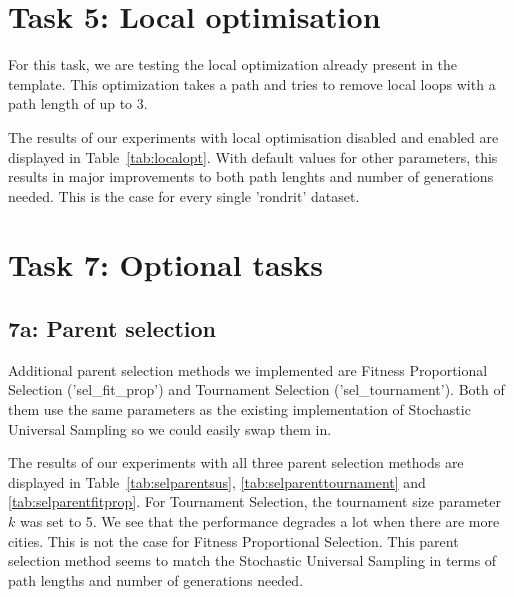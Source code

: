 \documentclass{report}
\begin{document}
\section{Task 5: Local optimisation}
\label{sec:local}
For this task, we are testing the local optimization already present in the template. This optimization takes a path and tries to remove local loops with a path length of up to 3.

The results of our experiments with local optimisation disabled and enabled are displayed in Table~\ref{tab:localopt}. With default values for other parameters, this results in major improvements to both path lenghts and number of generations needed. This is the case for every single 'rondrit' dataset.




\section{Task 7: Optional tasks}
\subsection{7a: Parent selection}
Additional parent selection methods we implemented are Fitness Proportional Selection ('sel\_fit\_prop') and Tournament Selection ('sel\_tournament'). Both of them use the same parameters as the existing implementation of Stochastic Universal Sampling so we could easily swap them in.

The results of our experiments with all three parent selection methods are displayed in Table~\ref{tab:selparentsus}, \ref{tab:selparenttournament} and \ref{tab:selparentfitprop}. For Tournament Selection, the tournament size parameter $k$ was set to 5. We see that the performance degrades a lot when there are more cities. This is not the case for Fitness Proportional Selection. This parent selection method seems to match the Stochastic Universal Sampling in terms of path lengths and number of generations needed.
\end{document}
